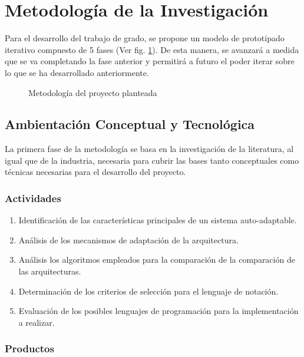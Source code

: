 \section{Metodología de la Investigación}

Para el desarrollo del trabajo de grado, se propone un modelo de prototipado iterativo compuesto de 5 fases (Ver fig. \ref{fig:met}). De esta manera, se avanzará a medida que se va completando la fase anterior y permitirá a futuro el poder iterar sobre lo que se ha desarrollado anteriormente.

\begin{figure}[H]
    \centering
    \caption{Metodología del proyecto planteada}
    
    \label{fig:met}
\end{figure}

\subsection{Ambientación Conceptual y Tecnológica}

La primera fase de la metodología se basa en la investigación de la literatura, al igual que de la industria, necesaria para cubrir las bases tanto conceptuales como técnicas necesarias para el desarrollo del proyecto. 

\subsubsection*{Actividades}

\begin{enumerate}
    \itemsep-2mm
    \item Identificación de las características principales de un sistema auto-adaptable.
    \item Análisis de los mecanismos de adaptación de la arquitectura.
    \item Análisis los algoritmos empleados para la comparación de la comparación de las arquitecturas.
    \item Determinación de los criterios de selección para el lenguaje de notación.
    \item Evaluación de los posibles lenguajes de programación para la implementación a realizar.
\end{enumerate} 

\subsubsection*{Productos}


